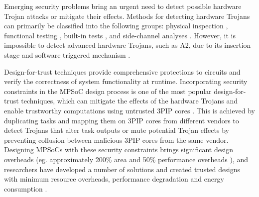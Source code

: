 \documentclass[10pt,journal, compsoc]{IEEEtran}
\begin{document}
Emerging security problems bring an urgent need to detect possible hardware Trojan attacks or mitigate their effects. Methods for detecting hardware Trojans can primarily be classified into the following groups: physical inspection \cite{network:SS}, functional testing \cite{conference:BB}, built-in tests \cite{article:DD}, and side-channel analyses \cite{article:YH1}. However, it is impossible to detect advanced hardware Trojans, such as A2, due to its insertion stage and software triggered mechanism \cite{conference:YH}.%



Design-for-trust techniques provide comprehensive protections to circuits and verify the correctness of system functionality at runtime. Incorporating security constraints in the MPSoC design process is one of the most popular design-for-trust techniques, which can mitigate the effects of the hardware Trojans and enable trustworthy computations using untrusted 3PIP cores \cite{article:JR3, article:TR, conference:MB, conference:XC, conference:JR2, conference:MS}. This is achieved by duplicating tasks and mapping them on 3PIP cores from different vendors to detect Trojans that alter task outputs or mute potential Trojan effects by preventing collusion between malicious 3PIP cores from the same vendor. Designing MPSoCs with these security constraints brings significant design overheads (eg. approximately 200\% area and 50\% performance overheads \cite{article:XC}), and researchers have developed a number of solutions and created trusted designs with minimum resource overheads, performance degradation and energy consumption \cite{article:SR, conference:AS, article:YS, article:XC}.
\end{document}
